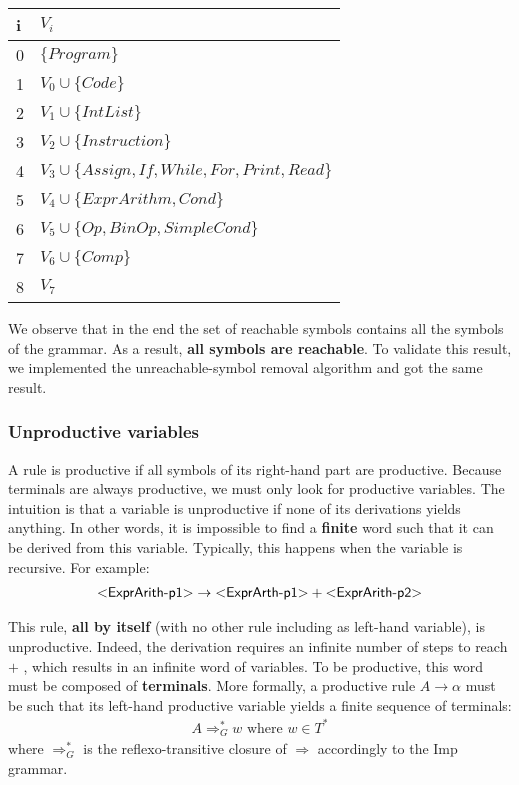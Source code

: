 \begin{tabular}{|l p{35em}|} \hline
   i & $V_i$ \\ \hline
  0 & $\{Program\}$ \\ \hline
  1 & $V_0 \cup \{Code\}$ \\ \hline
  2 & $V_1 \cup \{IntList\}$ \\ \hline
  3 & $V_2 \cup \{Instruction\}$ \\ \hline
  4 & $V_3 \cup \{Assign, If, While, For, Print, Read\}$ \\ \hline
  5 & $V_4 \cup \{ExprArithm, Cond\}$ \\ \hline
  6 & $V_5 \cup \{Op, BinOp, SimpleCond\}$ \\ \hline
  7 & $V_6 \cup \{Comp\}$ \\ \hline
  8 & $V_7$ \\ \hline
\end{tabular}

We observe that in the end the set of reachable symbols contains all the symbols of the grammar. As a result, \textbf{all symbols are reachable}.
To validate this result, we implemented the unreachable-symbol removal algorithm and got the same result.

\subsubsection{Unproductive variables}

A rule is productive if all symbols of its right-hand part are productive. Because terminals are always productive, we must only look for
productive variables. The intuition is that a variable is unproductive if none of its derivations yields anything. In other words, it is impossible to find a \textbf{finite} word such that it can be derived from this variable. Typically, this happens when the variable is recursive. For example:
\begin{equation}
  \begin{split}
    \varstyle{ExprArith-p1} \rightarrow \varstyle{ExprArth-p1} + \varstyle{ExprArith-p2}
   \end{split}
\end{equation}

This rule, \textbf{all by itself} (with no other rule including  as left-hand variable), is unproductive.
Indeed, the derivation requires an infinite number of steps to reach $ + $ , which results in an infinite word of variables.
To be productive, this word must be composed of \textbf{terminals}.
More formally, a productive rule $A \rightarrow \alpha$ must be such that its left-hand productive variable yields a finite sequence of terminals:
\begin{equation}
  \begin{split}
    A \Rightarrow_{G}^{*} w \text{ where } w \in T^{*}
  \end{split}
\end{equation}
where $\Rightarrow_{G}^{*}$ is the reflexo-transitive closure of $\Rightarrow$ accordingly to the Imp grammar.

